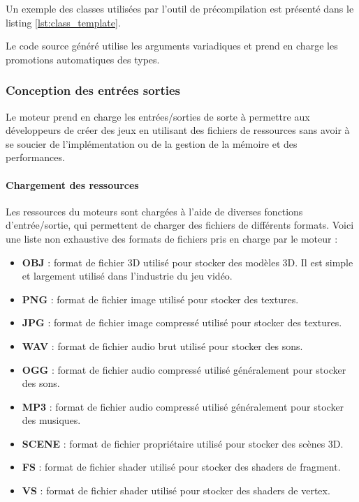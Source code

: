     Un exemple des classes utilisées par l'outil de précompilation est
    présenté dans le listing \ref{lst:class_template}.

    Le code source généré utilise les arguments variadiques et prend en charge
    les promotions automatiques des types.
\subsubsection{Conception des entrées sorties}

    Le moteur prend en charge les entrées/sorties de sorte à permettre
    aux développeurs de créer des jeux en utilisant des fichiers de
    ressources sans avoir à se soucier de l'implémentation ou de la gestion
    de la mémoire et des performances.
\paragraph{Chargement des ressources}

    Les ressources du moteurs sont chargées à l'aide de diverses
    fonctions d'entrée/sortie, qui permettent de charger des fichiers
    de différents formats. Voici une liste non exhaustive des formats
    de fichiers pris en charge par le moteur :
    \begin{itemize}
        \item \textbf{OBJ} : format de fichier 3D utilisé pour stocker
        des modèles 3D. Il est simple et largement utilisé dans
        l'industrie du jeu vidéo. \cite{obj_format}
        \item \textbf{PNG} : format de fichier image utilisé pour stocker
        des textures.
        \item \textbf{JPG} : format de fichier image compressé utilisé pour stocker
        des textures.
        \item \textbf{WAV} : format de fichier audio brut utilisé pour stocker
        des sons.
        \item \textbf{OGG} : format de fichier audio compressé utilisé généralement pour
        stocker des sons.
        \item \textbf{MP3} : format de fichier audio compressé utilisé généralement pour
        stocker des musiques.
        \item \textbf{SCENE} : format de fichier propriétaire utilisé pour
        stocker des scènes 3D.
        \item \textbf{FS} : format de fichier shader utilisé pour stocker
        des shaders de fragment. \cite{glsl}
        \item \textbf{VS} : format de fichier shader utilisé pour stocker
        des shaders de vertex. \cite{glsl}
    \end{itemize}
    
